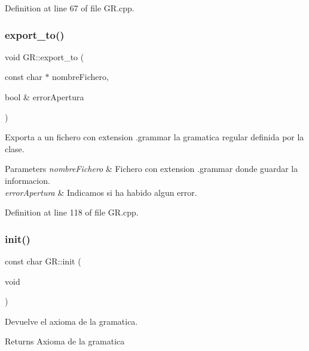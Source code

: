 Definition at line 67 of file G\+R.\+cpp.

\mbox{\label{class_g_r_a5c4dca6e2174446585a234b4e8792743}} 
\subsubsection{\texorpdfstring{export\+\_\+to()}{export\_to()}}
{\footnotesize\ttfamily void G\+R\+::export\+\_\+to (\begin{DoxyParamCaption}\item[{const char $\ast$}]{nombre\+Fichero,  }\item[{bool \&}]{error\+Apertura }\end{DoxyParamCaption})}



Exporta a un fichero con extension \textquotesingle{}.grammar\textquotesingle{} la gramatica regular definida por la clase. 


\begin{DoxyParams}{Parameters}
{\em nombre\+Fichero} & Fichero con extension \textquotesingle{}.grammar\textquotesingle{} donde guardar la informacion. \\
\hline
{\em error\+Apertura} & Indicamos si ha habido algun error. \\
\hline
\end{DoxyParams}


Definition at line 118 of file G\+R.\+cpp.

\mbox{\label{class_g_r_a9779d42d63d7a71b30cbf1e7ccb09807}} 
\subsubsection{\texorpdfstring{init()}{init()}}
{\footnotesize\ttfamily const char G\+R\+::init (\begin{DoxyParamCaption}\item[{void}]{ }\end{DoxyParamCaption})}



Devuelve el axioma de la gramatica. 

\begin{DoxyReturn}{Returns}
Axioma de la gramatica 
\end{DoxyReturn}


